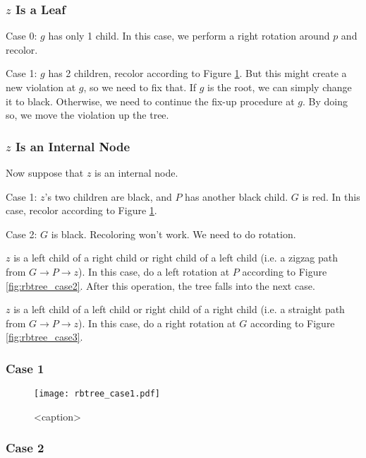 \subsubsection{$z$ Is a Leaf}

Case 0: $g$ has only 1 child. In this case, we perform a right rotation around $p$ and recolor.

Case 1: $g$ has 2 children, recolor according to Figure \ref{fig:rbtree_case1}. But this might create a new violation at $g$, so we need to fix that. If $g$ is the root, we can simply change it to black. Otherwise, we need to continue the fix-up procedure at $g$. By doing so, we move the violation up the tree.

\subsubsection{$z$ Is an Internal Node}

Now suppose that $z$ is an internal node.

Case 1: $z$'s two children are black, and $P$ has another black child. $G$ is red. In this case, recolor according to Figure \ref{fig:rbtree_case1}.

Case 2: $G$ is black. Recoloring won't work. We need to do rotation.

$z$ is a left child of a right child or right child of a left child (i.e. a zigzag path from $G \to P \to z$). In this case, do a left rotation at $P$ according to Figure \ref{fig:rbtree_case2}. After this operation, the tree falls into the next case.

$z$ is a left child of a left child or right child of a right child (i.e. a straight path from $G \to P \to z$). In this case, do a right rotation at $G$ according to Figure \ref{fig:rbtree_case3}.

\subsubsection{Case 1}

\begin{figure}[htbp]
    \centering
    \texttt{[image: rbtree\_case1.pdf]}
    \caption{<caption>}
    \label{fig:rbtree_case1}
\end{figure}

\subsubsection{Case 2}

